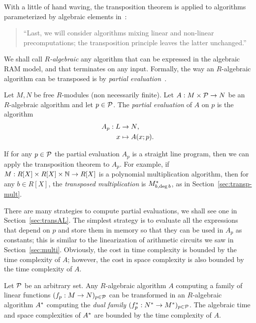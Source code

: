 With a little of hand waving, the transposition theorem is applied to
algorithms parameterized by algebraic elements
in~\cite{bostan+lecerf+schost:tellegen}:
\begin{quote}
  ``Last, we will consider algorithms mixing linear and non-linear
  precomputations; the transposition principle leaves the latter
  unchanged.''
\end{quote}

We shall call \emph{$R$-algebraic} any
algorithm that can be expressed in the algebraic RAM model, and that
terminates on any input. Formally, the way an $R$-algebraic algorithm
can be transposed is by \emph{partial
  evaluation}~\cite{consel+danvy93,riazanov+voronkov04,carette+kiselyov+shan09:jfp}.

\begin{definition}
  Let $M,N$ be free $R$-modules (non necessarily finite). Let
  $A:M\times\mathcal{P}\rightarrow N$ be an $R$-algebraic algorithm and let $p\in
  \mathcal{P}$. The \emph{partial evaluation} of
  $A$ on $p$ is the algorithm
  \begin{equation}
    \label{eq:274}
    \begin{aligned}
      A_{p}:L&\rightarrow N\text{,}\\
      x &\mapsto A(x;p)
      \text{.}
    \end{aligned}
  \end{equation}
\end{definition}

If for any $p\in\mathcal{P}$ the partial evaluation $A_{p}$ is
a straight line program, then we can apply the transposition theorem
to $A_{p}$. For example, if $M:R[X]\times R[X]\times \mathbb{N}\rightarrow R[X]$ is
a polynomial multiplication algorithm, then for any $b\in R[X]$, the
\emph{transposed multiplication} is $M_{b,\deg b}^\ast$, as in
Section~\ref{sec:transp-mult}.

There are many strategies to compute partial evaluations, we shall see
one in Section~\ref{sec:transAL}. The simplest strategy is to evaluate
all the expressions that depend on $p$ and store them in memory so
that they can be used in $A_p$ as constants; this is similar to the
linearization of arithmetic circuits we saw in
Section~\ref{sec:multi}. Obviously, the cost in time complexity is
bounded by the time complexity of $A$; however, the cost in space
complexity is also bounded by the time complexity of $A$.

\begin{principle}
  \label{th:tellegen-princip}
  Let $\mathcal{P}$ be an arbitrary set. Any $R$-algebraic algorithm $A$
  computing a family of linear functions $(f_p:M\rightarrow N)_{p\in\mathcal{P}}$
  can be transformed in an $R$-algebraic algorithm $A^\ast$
  computing the \emph{dual family}
  $(f^\ast_p:N^\ast\rightarrow M^\ast)_{p\in\mathcal{P}}$. The algebraic time
  and space complexities of $A^\ast$ are bounded by the time
  complexity of $A$.
\end{principle}


